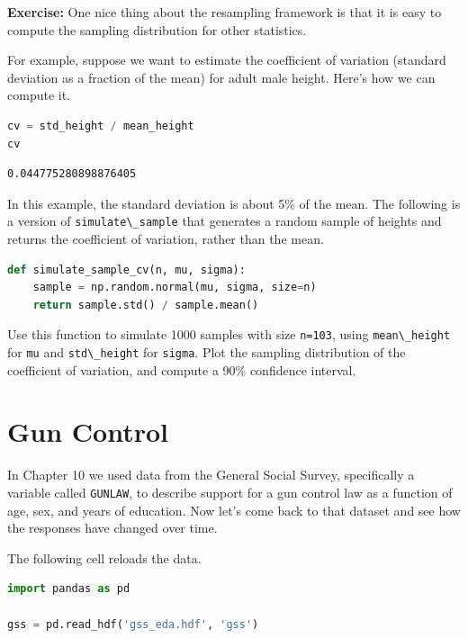 \textbf{Exercise:} One nice thing about the resampling framework is that
it is easy to compute the sampling distribution for other statistics.

For example, suppose we want to estimate the coefficient of variation
(standard deviation as a fraction of the mean) for adult male height.
Here's how we can compute it.

\begin{lstlisting}[language=Python,style=source]
cv = std_height / mean_height
cv
\end{lstlisting}

\begin{lstlisting}[style=output]
0.044775280898876405
\end{lstlisting}

In this example, the standard deviation is about 5\% of the mean. The
following is a version of \passthrough{\lstinline!simulate\_sample!}
that generates a random sample of heights and returns the coefficient of
variation, rather than the mean.

\begin{lstlisting}[language=Python,style=source]
def simulate_sample_cv(n, mu, sigma):
    sample = np.random.normal(mu, sigma, size=n)
    return sample.std() / sample.mean()
\end{lstlisting}

Use this function to simulate 1000 samples with size
\passthrough{\lstinline!n=103!}, using
\passthrough{\lstinline!mean\_height!} for \passthrough{\lstinline!mu!}
and \passthrough{\lstinline!std\_height!} for
\passthrough{\lstinline!sigma!}. Plot the sampling distribution of the
coefficient of variation, and compute a 90\% confidence interval.

\hypertarget{gun-control}{%
\section{Gun Control}\label{gun-control}}

In Chapter 10 we used data from the General Social Survey, specifically
a variable called \passthrough{\lstinline!GUNLAW!}, to describe support
for a gun control law as a function of age, sex, and years of education.
Now let's come back to that dataset and see how the responses have
changed over time.

The following cell reloads the data.

\begin{lstlisting}[language=Python,style=source]
import pandas as pd

gss = pd.read_hdf('gss_eda.hdf', 'gss')
\end{lstlisting}

